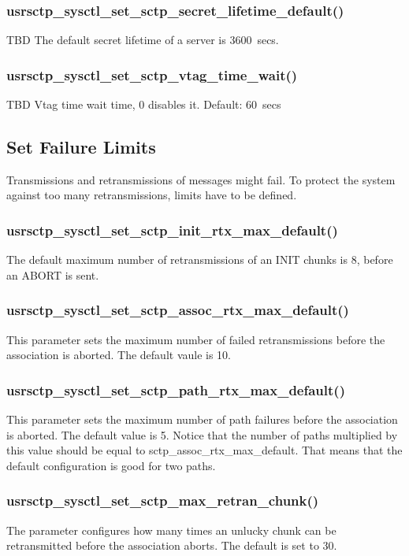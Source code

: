 \documentclass[a4paper]{article}
\begin{document}
\subsubsection{usrsctp\_sysctl\_set\_sctp\_secret\_lifetime\_default()}
TBD
The default secret lifetime of a server is 3600~secs.

\subsubsection{usrsctp\_sysctl\_set\_sctp\_vtag\_time\_wait()}
TBD
Vtag time wait time, 0 disables it. Default: 60~secs


\subsection{Set Failure Limits}
Transmissions and retransmissions of messages might fail. To protect the system against too many
retransmissions, limits have to be defined.

\subsubsection{usrsctp\_sysctl\_set\_sctp\_init\_rtx\_max\_default()}
The default maximum number of retransmissions of an INIT chunks is 8, before an ABORT is sent.

\subsubsection{usrsctp\_sysctl\_set\_sctp\_assoc\_rtx\_max\_default()}
This parameter sets the maximum number of failed retransmissions before the association is aborted.
The default vaule is 10.

\subsubsection{usrsctp\_sysctl\_set\_sctp\_path\_rtx\_max\_default()}
This parameter sets the maximum number of path failures before the association is aborted.
The default value is 5. Notice that the number of paths multiplied by this value should be 
equal to sctp\_assoc\_rtx\_max\_default. That means that the default configuration is good for two 
paths.

\subsubsection{usrsctp\_sysctl\_set\_sctp\_max\_retran\_chunk()}
The parameter configures how many times an unlucky chunk can be retransmitted before the 
association aborts. The default is set to 30.
				
\end{document}
